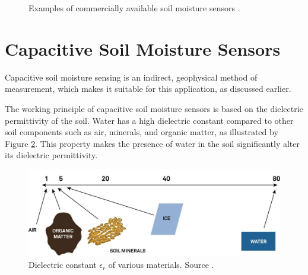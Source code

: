 \begin{figure}
    \hfil
    \caption{\label{fig:satellite}Examples of commercially available soil moisture sensors \cite{meter_group_teros_nodate, baseline_soil_2021, czechproject_spol_sro_pudni_2024}.}
\end{figure}

\section{\label{section:soil-moisure-sensors-theory}Capacitive Soil Moisture Sensors}
Capacitive soil moisture sensing is an indirect, geophysical method of measurement, which makes it suitable for this application, as discussed earlier.

The working principle of capacitive soil moisture sensors is based on the dielectric permittivity of the soil. Water has a high dielectric constant compared to other soil components such as air, minerals, and organic matter, as illustrated by Figure \ref{fig:dielectric-constant}. This property makes the presence of water in the soil significantly alter its dielectric permittivity.

\begin{figure}
    \includegraphics[width=.7\textwidth]{fig/dielectric-constant.jpg}
    \caption{\label{fig:dielectric-constant}Dielectric constant $\epsilon_r$ of various materials. Source \cite{meter_group_soil_2023}.}
\end{figure}

